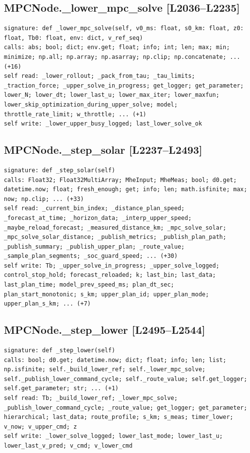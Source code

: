 \documentclass[a4paper,10pt,oneside]{book}
\begin{document}
\subsection*{MPCNode.\_lower\_mpc\_solve [L2036--L2235]}
\begin{lstlisting}[numbers=none]
signature: def _lower_mpc_solve(self, v0_ms: float, s0_km: float, z0: float, Tb0: float, env: dict, v_ref_seq)
calls: abs; bool; dict; env.get; float; info; int; len; max; min; minimize; np.all; np.array; np.asarray; np.clip; np.concatenate; ... (+16)
self read: _lower_rollout; _pack_from_tau; _tau_limits; _traction_force; _upper_solve_in_progress; get_logger; get_parameter; lower_N; lower_dt; lower_last_u; lower_max_iter; lower_maxfun; lower_skip_optimization_during_upper_solve; model; throttle_rate_limit; w_throttle; ... (+1)
self write: _lower_upper_busy_logged; last_lower_solve_ok
\end{lstlisting}
\subsection*{MPCNode.\_step\_solar [L2237--L2493]}
\begin{lstlisting}[numbers=none]
signature: def _step_solar(self)
calls: Float32; Float32MultiArray; MheInput; MheMeas; bool; d0.get; datetime.now; float; fresh_enough; get; info; len; math.isfinite; max; now; np.clip; ... (+33)
self read: _current_bin_index; _distance_plan_speed; _forecast_at_time; _horizon_data; _interp_upper_speed; _maybe_reload_forecast; _measured_distance_km; _mpc_solve_solar; _mpc_solve_solar_distance; _publish_metrics; _publish_plan_path; _publish_summary; _publish_upper_plan; _route_value; _sample_plan_segments; _soc_guard_speed; ... (+30)
self write: Tb; _upper_solve_in_progress; _upper_solve_logged; control_stop_hold; forecast_reloaded; k; last_bin; last_data; last_plan_time; model_prev_speed_ms; plan_dt_sec; plan_start_monotonic; s_km; upper_plan_id; upper_plan_mode; upper_plan_s_km; ... (+7)
\end{lstlisting}
\subsection*{MPCNode.\_step\_lower [L2495--L2544]}
\begin{lstlisting}[numbers=none]
signature: def _step_lower(self)
calls: bool; d0.get; datetime.now; dict; float; info; len; list; np.isfinite; self._build_lower_ref; self._lower_mpc_solve; self._publish_lower_command_cycle; self._route_value; self.get_logger; self.get_parameter; str; ... (+1)
self read: Tb; _build_lower_ref; _lower_mpc_solve; _publish_lower_command_cycle; _route_value; get_logger; get_parameter; hierarchical; last_data; route_profile; s_km; s_meas; timer_lower; v_now; v_upper_cmd; z
self write: _lower_solve_logged; lower_last_mode; lower_last_u; lower_last_v_pred; v_cmd; v_lower_cmd
\end{lstlisting}
\end{document}
